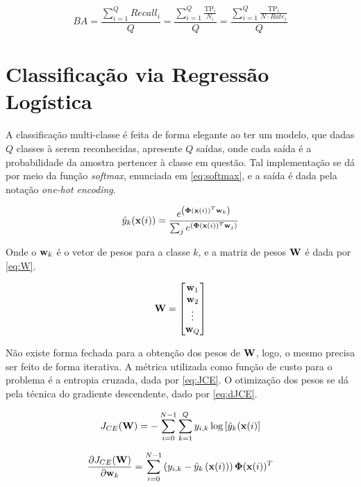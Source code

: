 \begin{equation}\label{eq:ba}
	BA = \frac{\sum_{i=1}^{Q}Recall_i}{Q} = \frac{\sum_{i=1}^{Q}\frac{\text{TP}_i}{N_i}}{Q} = \frac{\sum_{i=1}^{Q}\frac{\text{TP}_i}{N\cdot Rate_i}}{Q}
\end{equation}



\clearpage
\section{Classificação via Regressão Logística}

A classificação multi-classe é feita de forma elegante ao ter um modelo, que dadas $Q$ classes à serem reconhecidas, apresente $Q$ saídas, onde cada saída é a probabilidade da amostra pertencer à classe em questão. Tal implementação se dá por meio da função \textit{softmax}, enunciada em \eqref{eq:softmax}, e a saída é dada pela notação \textit{one-hot encoding}.

\begin{equation}\label{eq:softmax}
	\hat{y}_k (\mathbf{x}(i)) = \frac{e^{\left(\mathbf{\Phi}(\mathbf{x}(i))^T\mathbf{w}_k\right)}}{\sum_{j}e^{\left(\mathbf{\Phi}(\mathbf{x}(i))^T\mathbf{w}_j\right)}}
\end{equation}

Onde o $\mathbf{w}_k$ é o vetor de pesos para a classe $k$, e a matriz de pesos $\mathbf{W}$ é dada por \eqref{eq:W}.

\begin{equation}\label{eq:W}
	\mathbf{W} = \begin{bmatrix}
		\mathbf{w}_1 \\
		\mathbf{w}_2 \\
		\vdots \\
		\mathbf{w}_Q
	\end{bmatrix}
\end{equation}

Não existe forma fechada para a obtenção dos pesos de $\mathbf{W}$, logo, o mesmo precisa ser feito de forma iterativa. A métrica utilizada como função de custo para o problema é a entropia cruzada, dada por \eqref{eq:JCE}. O otimização dos pesos se dá pela técnica do gradiente descendente, dado por \eqref{eq:dJCE}.

\begin{equation}\label{eq:JCE}
	J_{CE}(\mathbf{W}) = -\sum_{i=0}^{N-1}\sum_{k=1}^{Q}y_{i,k}\log\left[\hat{y}_k(\mathbf{x}(i)\right]
\end{equation}

\begin{equation}\label{eq:dJCE}
	\frac{\partial J_{CE}(\mathbf{W})}{\partial \mathbf{w}_k} = \sum_{i=0}^{N-1} \left(y_{i,k} - \hat{y}_k\left(\mathbf{x}(i)\right)\right)\mathbf{\Phi}(\mathbf{x}(i))^T
\end{equation}

